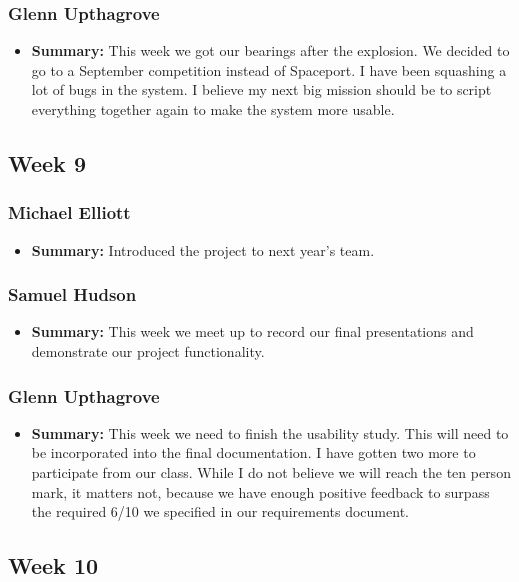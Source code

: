 \documentclass[onecolumn, draftclsnofoot,10pt, compsoc]{IEEEtran}
\begin{document}
\subsubsection{Glenn Upthagrove}
\begin{itemize}
 \item \textbf{Summary: } This week we got our bearings after the explosion. We decided to go to a September competition instead of Spaceport. I have been squashing a lot of bugs in the system. I believe my next big mission should be to script everything together again to make the system more usable. 
\end{itemize}
\subsection{Week 9}
\subsubsection{Michael Elliott}
\begin{itemize}
 \item \textbf{Summary: } Introduced the project to next year's team.
\end{itemize}
\subsubsection{Samuel Hudson}
\begin{itemize}
 \item \textbf{Summary: } This week we meet up to record our final presentations and demonstrate our project functionality.
\end{itemize}
\subsubsection{Glenn Upthagrove}
\begin{itemize}
 \item \textbf{Summary: } This week we need to finish the usability study. This will need to be incorporated into the final documentation. I have gotten two more to participate from our class. While I do not believe we will reach the ten person mark, it matters not, because we have enough positive feedback to surpass the required 6/10 we specified in our requirements document.
\end{itemize}
\subsection{Week 10}
\end{document}
